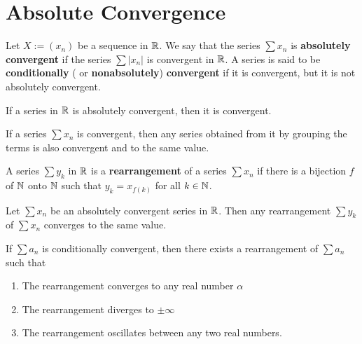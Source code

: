 \section{Absolute Convergence}

\begin{definition}
	Let $X:=(x_n)$ be a sequence in $\mathbb{R}$. We say that the series $\sum x_n$ is \textbf{absolutely convergent} if the series $\sum |x_n|$ is convergent in $\mathbb{R}$. A series is said to be \textbf{conditionally} ( or \textbf{nonabsolutely}) \textbf{convergent} if it is convergent, but it is not absolutely convergent.
\end{definition}

\begin{theorem}
	If a series in $\mathbb{R}$ is absolutely convergent, then it is convergent.
\end{theorem}

\begin{theorem}
	If a series $\sum x_n$ is convergent, then any series obtained from it by grouping  the terms is also convergent and to the same value.
\end{theorem}

\begin{definition}
	A series $\sum y_k$ in $\mathbb{R}$ is a \textbf{rearrangement} of a series $\sum x_n$ if there is a bijection $f$ of $\mathbb{N}$ onto $\mathbb{N}$ such that $y_k=x_{f(k)}$ for all $k \in \mathbb{N}$.
\end{definition}

\begin{theorem}
	Let $\sum x_n$ be an absolutely convergent series in $\mathbb{R}$. Then any rearrangement $\sum y_k$ of $\sum x_n$ converges to the same value.
\end{theorem}

\begin{theorem}
	If $\sum a_n$ is conditionally convergent, then there exists a rearrangement of $\sum a_n$ such that
	\begin{enumerate}
		\item The rearrangement converges to any real number $\alpha$
		\item The rearrangement diverges to $\pm \infty$
		\item The rearrangement oscillates between any two real numbers.
	\end{enumerate}
\end{theorem}

